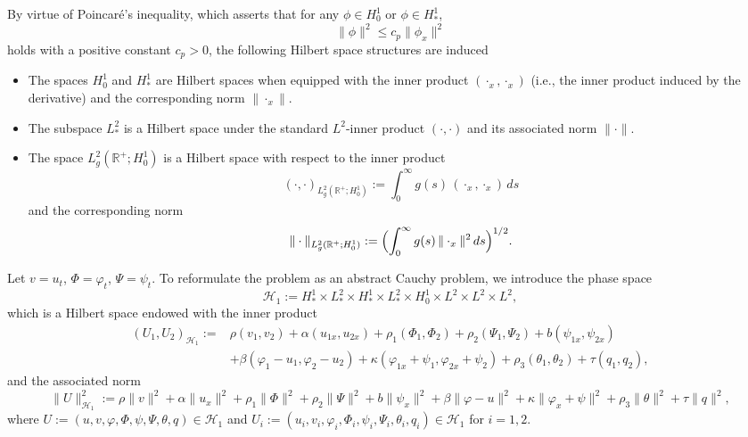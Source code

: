 \documentclass[11pt,reqno]{article}
\begin{document}
By virtue of Poincar\'e's inequality, which asserts that for any \(\phi \in H_0^1\) or \(\phi \in H_*^1\),
\[
\|\phi\|^2 \le c_p \|\phi_x\|^2
\]
holds with a positive constant \(c_p > 0\), the following Hilbert space structures are induced
\begin{itemize}
	\item  The spaces \(H_0^1\) and \(H_*^1\) are Hilbert spaces when equipped with the inner product \((\cdot_x, \cdot_x)\) (i.e., the inner product induced by the derivative) and the corresponding norm \(\|\cdot_x\|\).
	
	\item The subspace \(L_*^2\) is a Hilbert space under the standard \(L^2\)-inner product \((\cdot,\cdot)\) and its associated norm \(\|\cdot\|\).
	
	\item  The space \(L_g^2(\mathbb{R}^+; H_0^1)\) is a Hilbert space with respect to the inner product
        \[
        (\cdot, \cdot)_{L_g^2(\mathbb{R}^+; H_0^1)} := \int_0^{\infty} g(s)\, (\cdot_x, \cdot_x) \, ds
        \]
        and the corresponding norm
        \[
        \|\cdot\|_{L_g^2(\mathbb{R}^+; H_0^1)} := \Bigl( \int_0^{\infty} g(s)\, \|\cdot_x\|^2 \, ds \Bigr)^{1/2}.
        \]
\end{itemize}

Let \(v = u_t\), \(\Phi = \varphi_t\), \(\Psi = \psi_t\). To reformulate the problem as an abstract Cauchy problem, we introduce the phase space
\[
\mathcal{H}_1 := H_*^1 \times L_*^2 \times H_*^1 \times L_*^2 \times H_0^1 \times L^2 \times L^2 \times L^2,
\]
which is a Hilbert space endowed with the inner product
\begin{align*}
	(U_1, U_2)_{\mathcal{H}_1} := &\rho(v_1, v_2) + \alpha (u_{1x}, u_{2x}) + \rho_1(\Phi_1, \Phi_2) + \rho_2(\Psi_1, \Psi_2) + b (\psi_{1x},\psi_{2x}) \\
	&+ \beta (\varphi_1 - u_1, \varphi_2 - u_2) + \kappa(\varphi_{1x} + \psi_1, \varphi_{2x} + \psi_2) + \rho_3(\theta_1, \theta_2) + \tau(q_1, q_2),
\end{align*}
and the associated norm
\[
\|U\|_{\mathcal{H}_1}^2 := \rho\|v\|^2 + \alpha\|u_x\|^2 + \rho_1\|\Phi\|^2 + \rho_2\|\Psi\|^2 + b\|\psi_x\|^2 + \beta\|\varphi - u\|^2 + \kappa\|\varphi_x + \psi\|^2 + \rho_3\|\theta\|^2 + \tau \|q\| ^2,
\]
where \(U := (u, v, \varphi, \Phi, \psi, \Psi, \theta, q) \in \mathcal{H}_1\) and \(U_i := (u_i, v_i, \varphi_i, \Phi_i, \psi_i, \Psi_i, \theta_i, q_i) \in \mathcal{H}_1\) for \(i = 1, 2\).
\end{document}
